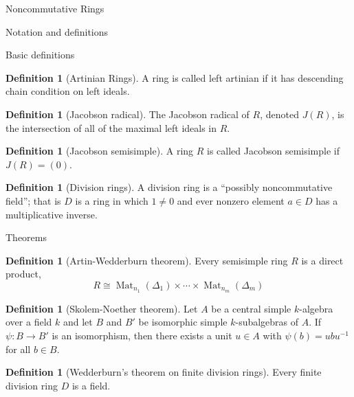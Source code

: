 \documentclass{article}
\theoremstyle{definition}
\numberwithin{theorem}{subsection} %
\theoremstyle{remark}
\theoremstyle{definition}
\newtheorem{definition}[paragraph]{Definition}
\newcommand{\Mat}{\operatorname{Mat}}
\newcommand{\fn}[3]{{#1 \colon #2 \rightarrow #3}}
\begin{document}
\pagebreak
\begin{section}{Noncommutative Rings}
  \begin{subsection}{Notation and definitions}
    \begin{subsubsection}{Basic definitions}
      \begin{definition}[Artinian Rings]
        A ring is called left artinian if it has descending chain condition on
        left ideals.
      \end{definition}
      \begin{definition}[Jacobson radical]
        The Jacobson radical of $R$, denoted $J(R)$, is the intersection of all
        of the maximal left ideals in $R$.
      \end{definition}
      \begin{definition}[Jacobson semisimple]
        A ring $R$ is called Jacobson semisimple if $J(R) = (0)$.
      \end{definition}
      \begin{definition}[Division rings]
        A division ring is a ``possibly noncommutative field''; that is $D$ is a
        ring in which $1 \neq 0$ and ever nonzero element $a \in D$ has a
        multiplicative inverse.
      \end{definition}
    \end{subsubsection}
  \end{subsection}
  \begin{subsection}{Theorems}
    \begin{definition}[Artin-Wedderburn theorem]
      Every semisimple ring $R$ is a direct product, \[
        R \cong \Mat_{n_1}(\Delta_1) \times \cdots \times \Mat_{n_m}(\Delta_m)
      \]
    \end{definition}
    \begin{definition}[Skolem-Noether theorem]
      Let $A$ be a central simple $k$-algebra over a field $k$ and let $B$ and
      $B'$ be isomorphic simple $k$-subalgebras of $A$.
      If $\fn \psi B {B'}$ is an isomorphism, then there exists a unit $u \in A$
      with $\psi(b) = ubu^{-1}$ for all $b \in B$.
    \end{definition}
    \begin{definition}[Wedderburn's theorem on finite division rings]
      Every finite division ring $D$ is a field.
    \end{definition}
  \end{subsection}
\end{section}
\end{document}
